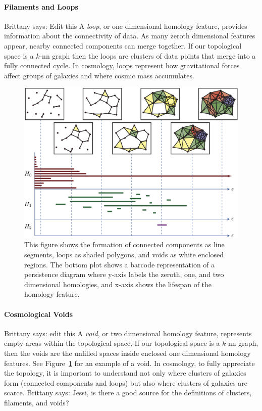 \documentclass[12pt]{article}
\newcommand{\brittany}[1]{{\color{cyan} Brittany says: #1}}
\newcommand{\figref}[1]{Figure~\ref{#1}}
\begin{document}
\paragraph{Filaments and Loops} \brittany{Edit this} A \emph{loop}, or one dimensional homology feature, provides information about the connectivity of data. As many zeroth dimensional features appear, nearby connected components can merge together. If our topological space is a $k$-nn graph then the loops are clusters of data points that merge into a fully connected cycle. In cosmology, loops represent how gravitational forces affect groups of galaxies and where cosmic mass accumulates.

\begin{center}
\begin{figure}[htp!]
  \centering
  \includegraphics[width=0.85\linewidth]{homologyobjects.png}
    \caption{This figure shows the formation of connected components as line segments, loops as shaded polygons, and voids as white enclosed regions. The bottom plot shows a barcode representation of a persistence diagram where y-axis labels the zeroth, one, and two dimensional homologies, and x-axis shows the lifespan of the homology feature.}
    \label{fig:homologydemo}
\end{figure}
\end{center}

\paragraph{Cosmological Voids} \brittany{edit this} A \emph{void}, or two dimensional homology feature, represents empty areas within the topological space. If our topological space is a $k$-nn graph, then the voids are the unfilled spaces inside enclosed one dimensional homology features. See \figref{fig:homologydemo} for an example of a void. In cosmology, to fully appreciate the topology, it is important to understand not only where clusters of galaxies form (connected components and loops) but also where clusters of galaxies are scarce. \brittany{Jessi, is there a good source for the definitions of clusters, filaments, and voids?}
\end{document}
